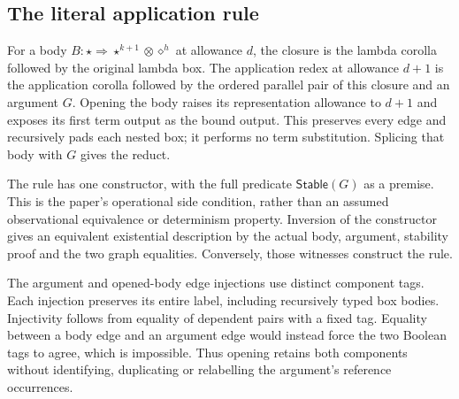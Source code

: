


\subsection{The literal application rule}

For a body $B:\star\Rightarrow\star^{k+1}\otimes\diamond^h$ at allowance $d$,
the closure is the lambda corolla followed by the original lambda box.
The application redex at allowance $d+1$ is the application corolla followed
by the ordered parallel pair of this closure and an argument $G$.
Opening the body raises its representation allowance to $d+1$ and exposes
its first term output as the bound output. This preserves every edge and
recursively pads each nested box; it performs no term substitution.
Splicing that body with $G$ gives the reduct.





The rule has one constructor, with the full predicate $\mathsf{Stable}(G)$
as a premise. This is the paper's operational side condition, rather than
an assumed observational equivalence or determinism property. Inversion of
the constructor gives an equivalent existential description by the actual
body, argument, stability proof and the two graph equalities. Conversely,
those witnesses construct the rule.



The argument and opened-body edge injections use distinct component
tags. Each injection preserves its entire label, including recursively typed
box bodies. Injectivity follows from equality of dependent pairs with a
fixed tag. Equality between a body edge and an argument edge would instead
force the two Boolean tags to agree, which is impossible. Thus opening
retains both components without identifying, duplicating or relabelling
the argument's reference occurrences.

